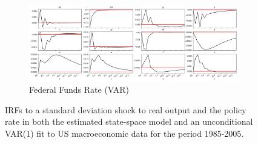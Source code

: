 \documentclass{article}
\begin{document}
\begin{figure}
\begin{subfigure}{0.8\textwidth}
  \end{subfigure}
  \begin{subfigure}{0.8\textwidth}
    \includegraphics[width=\linewidth]{images/real_data_rm_var_irf.png}
    \caption{Federal Funds Rate (VAR)}
    \label{us_rm_var_irf}
  \end{subfigure}

  \caption{IRFs to a standard deviation shock to real output and the policy rate in both the estimated state-space model and an unconditional VAR(1) fit to US macroeconomic data for the period 1985-2005.}
  \label{us_yrm_irfs}
\end{figure}
\end{document}
